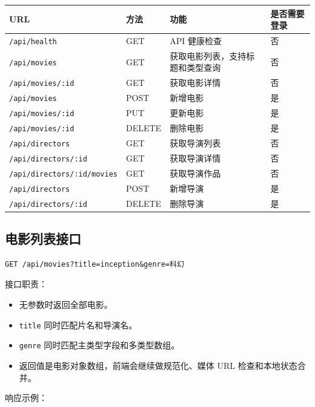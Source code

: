\documentclass[
]{ctexart}
\providecommand{\tightlist}{%
  \setlength{\itemsep}{0pt}\setlength{\parskip}{0pt}}
\begin{document}
\begin{longtable}[]{@{}llll@{}}
\toprule
URL & 方法 & 功能 & 是否需要登录 \\
\midrule
\endhead
\texttt{/api/health} & GET & API 健康检查 & 否 \\
\texttt{/api/movies} & GET & 获取电影列表，支持标题和类型查询 & 否 \\
\texttt{/api/movies/:id} & GET & 获取电影详情 & 否 \\
\texttt{/api/movies} & POST & 新增电影 & 是 \\
\texttt{/api/movies/:id} & PUT & 更新电影 & 是 \\
\texttt{/api/movies/:id} & DELETE & 删除电影 & 是 \\
\texttt{/api/directors} & GET & 获取导演列表 & 否 \\
\texttt{/api/directors/:id} & GET & 获取导演详情 & 否 \\
\texttt{/api/directors/:id/movies} & GET & 获取导演作品 & 否 \\
\texttt{/api/directors} & POST & 新增导演 & 是 \\
\texttt{/api/directors/:id} & DELETE & 删除导演 & 是 \\
\bottomrule
\end{longtable}

\hypertarget{ux7535ux5f71ux5217ux8868ux63a5ux53e3}{%
\subsection{电影列表接口}\label{ux7535ux5f71ux5217ux8868ux63a5ux53e3}}

\begin{verbatim}
GET /api/movies?title=inception&genre=科幻
\end{verbatim}

接口职责：

\begin{itemize}
\tightlist
\item
  无参数时返回全部电影。
\item
  \texttt{title} 同时匹配片名和导演名。
\item
  \texttt{genre} 同时匹配主类型字段和多类型数组。
\item
  返回值是电影对象数组，前端会继续做规范化、媒体 URL
  检查和本地状态合并。
\end{itemize}

响应示例：
\end{document}
